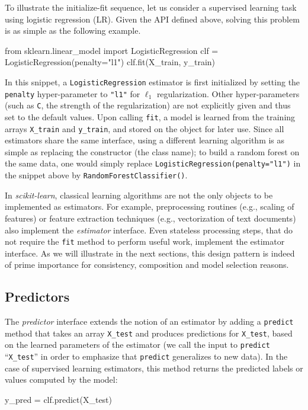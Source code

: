 \documentclass[twocolumn]{article}
\newcommand{\sklearn}{\textit{scikit-learn}\xspace}
\begin{document}
To illustrate the initialize-fit sequence,
let us consider a supervised learning task using logistic regression (LR).
Given the API defined above, solving this problem is as simple as the following
example.
\begin{pythoncode}
from sklearn.linear_model import LogisticRegression
clf = LogisticRegression(penalty="l1")
clf.fit(X_train, y_train)
\end{pythoncode}
In this snippet, a \texttt{LogisticRegression} estimator is first initialized by
setting the \texttt{penalty} hyper-parameter to \texttt{"l1"} for
$\ell_1$ regularization. Other hyper-parameters (such as \texttt{C},
the strength of the regularization) are not explicitly given and
thus set to the default values. Upon calling \texttt{fit}, a model is
learned from the training arrays \texttt{X\_train} and \texttt{y\_train},
and stored on the object for later use.
Since all estimators share the same interface, using a different learning algorithm is
as simple as replacing the constructor (the class name);
to build a random forest on
the same data, one would simply replace
\texttt{LogisticRegression(penalty="l1")} in the snippet above by
\texttt{RandomForestClassifier()}.

In \sklearn, classical learning algorithms are not the only objects to be
implemented as estimators. For example, preprocessing routines (e.g., scaling of
features) or feature extraction techniques (e.g., vectorization of text
documents) also implement the \textit{estimator} interface. Even stateless
processing steps, that do not require the \texttt{fit} method to
perform useful work, implement the estimator interface. As we will illustrate
in the next sections, this design pattern is indeed of prime importance for
consistency, composition and model selection reasons.

\subsection{Predictors}

The \textit{predictor} interface extends the notion of an estimator
by adding a \texttt{predict}
method that takes an array \texttt{X\_test} and produces
predictions for \texttt{X\_test}, based on the learned parameters of the
estimator (we call the input to \texttt{predict} ``\texttt{X\_test}'' in order
to emphasize that \texttt{predict} generalizes to new data). In the case of
supervised learning estimators, this method returns the predicted
labels or values computed by the model:
\begin{pythoncode}
y_pred = clf.predict(X_test)
\end{pythoncode}
\end{document}
